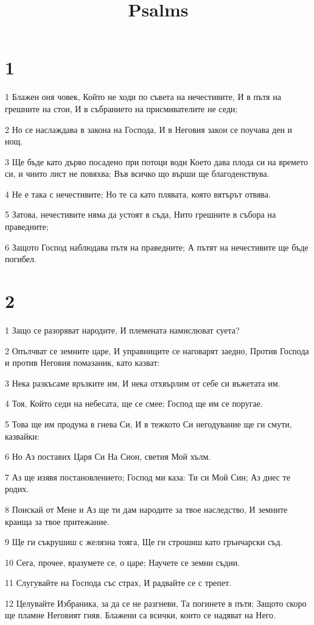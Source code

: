

\title{Psalms}


\chapter{1}

\par 1 Блажен оня човек, Който не ходи по съвета на нечестивите, И в пътя на грешните на стои, И в събранието на присмивателите не седи;
\par 2 Но се наслаждава в закона на Господа, И в Неговия закон се поучава ден и нощ.
\par 3 Ще бъде като дърво посадено при потоци води Което дава плода си на времето си, и чиито лист не повяхва; Във всичко що върши ще благоденствува.
\par 4 Не е така с нечестивите; Но те са като плявата, която вятърът отвява.
\par 5 Затова, нечестивите няма да устоят в съда, Нито грешните в събора на праведните;
\par 6 Защото Господ наблюдава пътя на праведните; А пътят на нечестивите ще бъде погибел.

\chapter{2}

\par 1 Защо се разоряват народите, И племената намислюват суета?
\par 2 Опълчват се земните царе, И управниците се наговарят заедно, Против Господа и против Неговия помазаник, като казват:
\par 3 Нека разкъсаме връзките им, И нека отхвърлим от себе си въжетата им.
\par 4 Тоя, Който седи на небесата, ще се смее; Господ ще им се поругае.
\par 5 Това ще им продума в гнева Си, И в тежкото Си негодувание ще ги смути, казвайки:
\par 6 Но Аз поставих Царя Си На Сион, светия Мой хълм.
\par 7 Аз ще изявя постановлението; Господ ми каза: Ти си Мой Син; Аз днес те родих.
\par 8 Поискай от Мене и Аз ще ти дам народите за твое наследство, И земните краища за твое притежание.
\par 9 Ще ги съкрушиш с желязна тояга, Ще ги строшиш като грънчарски съд.
\par 10 Сега, прочее, вразумете се, о царе; Научете се земни съдии.
\par 11 Слугувайте на Господа със страх, И радвайте се с трепет.
\par 12 Целувайте Избраника, за да се не разгневи, Та погинете в пътя; Защото скоро ще пламне Неговият гняв. Блажени са всички, които се надяват на Него.

